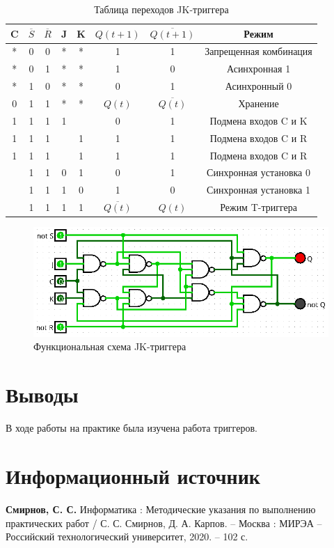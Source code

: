 \documentclass[14pt, a4paper]{extreport}
\newcommand\clocktb{%
	\begin{tikzpicture}[scale=0.25pt]
		\draw (0,1) -- (1,1) -- (1,0) -- (2,0);
	\end{tikzpicture}%
}
\begin{document}
\begin{table}[H]
	\caption{Таблица переходов JK-триггера}
	\label{tab:jk}
	\begin{tabular}{|c|c|c|c|c|c|c|c|}
		\hline
		C & $\overline{S}$ & $\overline{R}$ & J & K & $Q(t + 1)$ & $\overline{Q(t + 1)}$ & Режим \\
		\hline
		* & 0 & 0 & * & * & 1 & 1 & Запрещенная комбинация \\
		\hline
		* & 0 & 1 & * & * & 1 & 0 & Асинхронная 1 \\
		\hline
		* & 1 & 0 & * & * & 0 & 1 & Асинхронный 0 \\
		\hline
		0 & 1 & 1 & * & * & $Q(t)$ & $\overline{Q(t)}$ & Хранение \\
		\hline
		1 & 1 & 1 & 1 & \clocktb & 0 & 1 & Подмена входов C и K \\
		\hline
		1 & 1 & 1 & \clocktb & 1 & 1 & 1 & Подмена входов C и R \\
		\hline
		1 & 1 & 1 & \clocktb & 1 & 1 & 1 & Подмена входов C и R \\
		\hline
		\clocktb & 1 & 1 & 0 & 1 & 0 & 1 & Синхронная установка 0 \\
		\hline
		\clocktb & 1 & 1 & 1 & 0 & 1 & 0 & Синхронная установка 1 \\
		\hline
		\clocktb & 1 & 1 & 1 & 1 & $\overline{Q(t)}$ & $Q(t)$ & Режим T-триггера \\
		\hline
	\end{tabular}
\end{table}

\begin{figure}[H]
	\caption{Функциональная схема JK-триггера}
	\label{fig:jk}
	\includegraphics[width=\textwidth]{jk}
\end{figure}

\chapter{Выводы}
В ходе работы на практике была изучена работа триггеров.

\chapter{Информационный источник}
\textbf{Смирнов, С. С.} Информатика : Методические указания по выполнению практических работ / С. С. Смирнов, Д. А. Карпов. -- Москва : МИРЭА -- Российский технологический университет, 2020. -- 102 с.
\end{document}
